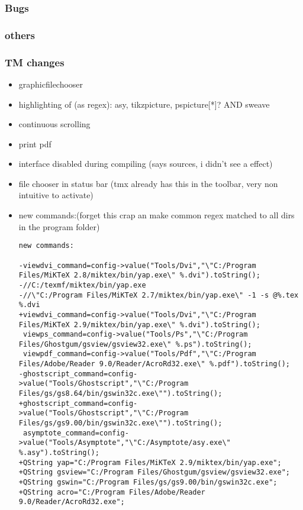 \documentclass[10pt,a4paper,landscape]{report}
\begin{document}
\subsubsection{Bugs}

\subsubsection{others}

\subsubsection{TM changes}

\begin{itemize}
\item graphicfilechooser
\item  highlighting of (as regex): asy, tikzpicture, pspicture[*]?         AND sweave
\item continuous scrolling
\item print pdf
\item interface disabled during compiling (says sources, i didn't see a effect)
\item file chooser in status bar (tmx already has this in the toolbar, very non intuitive to activate)
\item new commands:(forget this crap an make common regex matched to all dirs in the program folder)
\begin{verbatim}
new commands:

-viewdvi_command=config->value("Tools/Dvi","\"C:/Program Files/MiKTeX 2.8/miktex/bin/yap.exe\" %.dvi").toString();
-//C:/texmf/miktex/bin/yap.exe
-//\"C:/Program Files/MiKTeX 2.7/miktex/bin/yap.exe\" -1 -s @%.tex %.dvi
+viewdvi_command=config->value("Tools/Dvi","\"C:/Program Files/MiKTeX 2.9/miktex/bin/yap.exe\" %.dvi").toString();
 viewps_command=config->value("Tools/Ps","\"C:/Program Files/Ghostgum/gsview/gsview32.exe\" %.ps").toString();
 viewpdf_command=config->value("Tools/Pdf","\"C:/Program Files/Adobe/Reader 9.0/Reader/AcroRd32.exe\" %.pdf").toString();
-ghostscript_command=config->value("Tools/Ghostscript","\"C:/Program Files/gs/gs8.64/bin/gswin32c.exe\"").toString();
+ghostscript_command=config->value("Tools/Ghostscript","\"C:/Program Files/gs/gs9.00/bin/gswin32c.exe\"").toString();
 asymptote_command=config->value("Tools/Asymptote","\"C:/Asymptote/asy.exe\" %.asy").toString();
+QString yap="C:/Program Files/MiKTeX 2.9/miktex/bin/yap.exe";
+QString gsview="C:/Program Files/Ghostgum/gsview/gsview32.exe";
+QString gswin="C:/Program Files/gs/gs9.00/bin/gswin32c.exe";
+QString acro="C:/Program Files/Adobe/Reader 9.0/Reader/AcroRd32.exe";
 

\end{verbatim}
\end{itemize}
\end{document}
